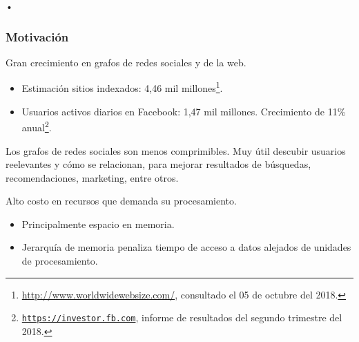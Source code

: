 \begin{frame}{•}
\frametitle{Motivación}

Gran crecimiento en grafos de redes sociales y de la web.
\begin{itemize}
	\item Estimación sitios indexados: 4,46 mil millones\footnote{\url{http://www.worldwidewebsize.com/}, consultado el 05 de octubre del 2018.}.
	\item Usuarios activos diarios en Facebook: 1,47 mil millones. Crecimiento de 11\% anual\footnote{\href{https://investor.fb.com/investor-news/press-release-details/2018/Facebook-Reports-Second-Quarter-2018-Results/default.aspx}{\texttt{https://investor.fb.com}}, informe de resultados del segundo trimestre del 2018.}.
\end{itemize}

{\parskip=4pt Los grafos de redes sociales son menos comprimibles.
Muy útil descubir usuarios reelevantes y cómo se relacionan, para mejorar resultados de búsquedas, recomendaciones, marketing, entre otros.

Alto costo en recursos que demanda su procesamiento.}
\begin{itemize}
	\item Principalmente espacio en memoria.
	\item Jerarquía de memoria penaliza tiempo de acceso a datos alejados de unidades de procesamiento.
\end{itemize}

\end{frame}
